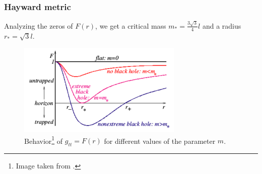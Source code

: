 \documentclass{beamer}
\begin{document}
\begin{frame}
\frametitle{Hayward metric}

Analyzing the zeros of $F(r)$, we get a critical mass $m_{*} = \frac{3\sqrt{3}}{4}l$ and a radius $r_{*} = \sqrt{3}l$.


\begin{figure}[h!]
	\centering
	\includegraphics[width=0.7\textwidth]{F(r)}
	\caption{Behavior\footnote{Image taken from \cite{hayward}.} of $g_{tt} = F(r)$ for different values of the parameter $m$.}
	
\end{figure}

\end{frame}

%
%
%
%
%
\end{document}
